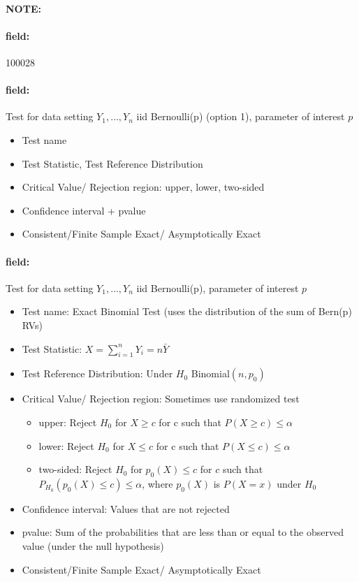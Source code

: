 \documentclass[12pt]{article}
\newenvironment{note}{\paragraph{NOTE:}}{}
\newenvironment{field}{\paragraph{field:}}{}
\begin{document}
\begin{note} \begin{field} \tiny 100028 \end{field}
 \begin{field}
  Test for data setting $Y_1, \ldots, Y_n$ iid Bernoulli(p) (option 1), parameter of interest $p$
  \begin{itemize}
   \item Test name
   \item Test Statistic, Test Reference Distribution
   \item Critical Value/ Rejection region:
         upper, lower, two-sided
   \item Confidence interval + pvalue
   \item Consistent/Finite Sample Exact/ Asymptotically Exact
  \end{itemize}
 \end{field}
 \begin{field}
  Test for data setting $Y_1, \ldots, Y_n$ iid Bernoulli(p), parameter of interest $p$
  \begin{itemize}
   \item Test name: Exact Binomial Test (uses the distribution of the sum of Bern(p) RVs)
   \item Test Statistic: $X = \sum_{i=1}^n Y_i = n\bar{Y}$
   \item Test Reference Distribution: Under $H_0$ Binomial$(n,p_0)$
   \item Critical Value/ Rejection region: Sometimes use randomized test
         \begin{itemize}
          \item upper: Reject $H_0$ for $X \geq c$ for c such that $P(X \geq c)\leq \alpha$
          \item lower: Reject $H_0$ for $X \leq c$ for c such that $P(X \leq c)\leq \alpha$
          \item two-sided: Reject $H_0$ for $p_0(X)\leq c$ for $c$ such that$P_{H_0}(p_0(X) \leq c)\leq \alpha$, where $p_0(X)$ is $P(X = x)$ under $H_0$
         \end{itemize}
   \item Confidence interval: Values that are not rejected
   \item pvalue: Sum of the probabilities that are less than or equal to the observed value (under the null hypothesis)
   \item Consistent/Finite Sample Exact/ Asymptotically Exact
  \end{itemize}
 \end{field}
\end{note}
\end{document}
